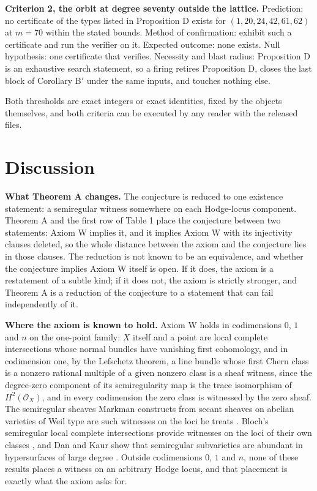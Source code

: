 \documentclass[10pt,twocolumn]{article}
\begin{document}
\textbf{Criterion 2, the orbit at degree seventy outside the lattice.}
Prediction: no certificate of the types listed in Proposition D exists
for \((1,20,24,42,61,62)\) at \(m=70\) within the stated bounds. Method
of confirmation: exhibit such a certificate and run the verifier on it.
Expected outcome: none exists. Null hypothesis: one certificate that
verifies. Necessity and blast radius: Proposition D is an exhaustive
search statement, so a firing retires Proposition D, closes the last
block of Corollary B\('\) under the same inputs, and touches nothing
else.

Both thresholds are exact integers or exact identities, fixed by the
objects themselves, and both criteria can be executed by any reader with
the released files.

\hypertarget{discussion}{%
\section{Discussion}\label{discussion}}

\textbf{What Theorem A changes.} The conjecture is reduced to one
existence statement: a semiregular witness somewhere on each Hodge-locus
component. Theorem A and the first row of Table 1 place the conjecture
between two statements: Axiom W implies it, and it implies Axiom W with
its injectivity clauses deleted, so the whole distance between the axiom
and the conjecture lies in those clauses. The reduction is not known to
be an equivalence, and whether the conjecture implies Axiom W itself is
open. If it does, the axiom is a restatement of a subtle kind; if it
does not, the axiom is strictly stronger, and Theorem A is a reduction
of the conjecture to a statement that can fail independently of it.

\textbf{Where the axiom is known to hold.} Axiom W holds in codimensions
\(0\), \(1\) and \(n\) on the one-point family: \(X\) itself and a point
are local complete intersections whose normal bundles have vanishing
first cohomology, and in codimension one, by the Lefschetz theorem, a
line bundle whose first Chern class is a nonzero rational multiple of a
given nonzero class is a sheaf witness, since the degree-zero component
of its semiregularity map is the trace isomorphism of
\(H^2(\mathcal{O}_X)\), and in every codimension the zero class is
witnessed by the zero sheaf. The semiregular sheaves Markman constructs
from secant sheaves on abelian varieties of Weil type are such witnesses
on the loci he treats \cite{markman2025}. Bloch's semiregular local
complete intersections provide witnesses on the loci of their own
classes \cite{bloch1972}, and Dan and Kaur show that semiregular
subvarieties are abundant in hypersurfaces of large degree
\cite{dankaur2016}. Outside codimensions \(0\), \(1\) and \(n\), none of
these results places a witness on an arbitrary Hodge locus, and that
placement is exactly what the axiom asks for.
\end{document}
